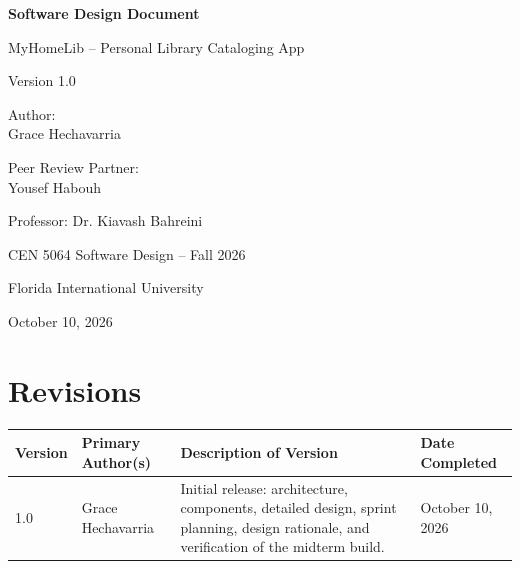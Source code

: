 \documentclass[12pt]{article}
\begin{document}
\begin{titlepage}
\centering

\vspace*{1cm}

{\Huge\textbf{Software Design Document}}

\vspace{0.5cm}

{\Large MyHomeLib -- Personal Library Cataloging App}

\vspace{2cm}

{\large Version 1.0}

\vspace{3cm}

Author:\\
Grace Hechavarria

\vspace{1cm}

Peer Review Partner:\\
Yousef Habouh

\vspace{2cm}

Professor: Dr. Kiavash Bahreini

\vspace{0.5cm}

CEN 5064 Software Design -- Fall 2026

\vspace{0.5cm}

Florida International University

\vfill

October 10, 2026

\end{titlepage}

\newpage

\section*{Revisions}

\begin{table}[H]
\centering
\begin{tabular}{|p{2cm}|p{4cm}|p{5.5cm}|l|}
\hline
\textbf{Version} & \textbf{Primary Author(s)} & \textbf{Description of Version} & \textbf{Date Completed} \\
\hline
1.0 & Grace Hechavarria & Initial release: architecture, components, detailed design, sprint planning, design rationale, and verification of the midterm build. & October 10, 2026 \\
\hline
\end{tabular}
\end{table}
\end{document}
